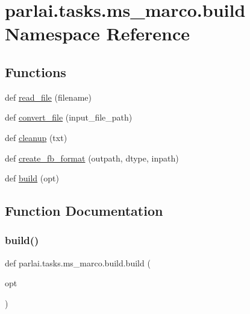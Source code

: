 \hypertarget{namespaceparlai_1_1tasks_1_1ms__marco_1_1build}{}\section{parlai.\+tasks.\+ms\+\_\+marco.\+build Namespace Reference}
\label{namespaceparlai_1_1tasks_1_1ms__marco_1_1build}
\subsection*{Functions}
\begin{DoxyCompactItemize}
\item 
def \hyperlink{namespaceparlai_1_1tasks_1_1ms__marco_1_1build_a8e7fee7824a3a7aa1facadf9979f3f4a}{read\+\_\+file} (filename)
\item 
def \hyperlink{namespaceparlai_1_1tasks_1_1ms__marco_1_1build_ac19db5d0ad4ba8559f6aca64f2fe192b}{convert\+\_\+file} (input\+\_\+file\+\_\+path)
\item 
def \hyperlink{namespaceparlai_1_1tasks_1_1ms__marco_1_1build_a6c94ade2f99fa70bf4103a22a1fbdc42}{cleanup} (txt)
\item 
def \hyperlink{namespaceparlai_1_1tasks_1_1ms__marco_1_1build_ac3cdd4cc2ccd3e9551ddd0349b94d537}{create\+\_\+fb\+\_\+format} (outpath, dtype, inpath)
\item 
def \hyperlink{namespaceparlai_1_1tasks_1_1ms__marco_1_1build_a3516057a3812247cdb1b1c9e8f6cb84d}{build} (opt)
\end{DoxyCompactItemize}


\subsection{Function Documentation}
\mbox{\label{namespaceparlai_1_1tasks_1_1ms__marco_1_1build_a3516057a3812247cdb1b1c9e8f6cb84d}} 
\subsubsection{\texorpdfstring{build()}{build()}}
{\footnotesize\ttfamily def parlai.\+tasks.\+ms\+\_\+marco.\+build.\+build (\begin{DoxyParamCaption}\item[{}]{opt }\end{DoxyParamCaption})}



